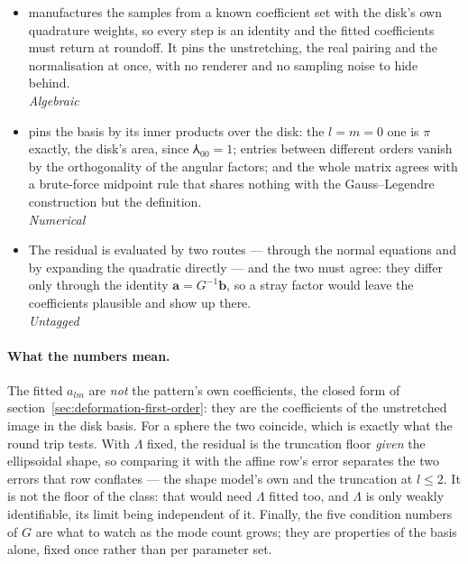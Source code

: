 \begin{itemize}
  \item[$\checkmark$]  manufactures the samples from a known
    coefficient set with the disk's own quadrature weights, so every step is an identity and the
    fitted coefficients must return at roundoff.  It pins the unstretching, the real pairing and the
    normalisation at once, with no renderer and no sampling noise to hide behind.
    \\[1pt] \quad \emph{Algebraic}
  \item[$\checkmark$]  pins the basis by its inner products over the disk: the
    $l = m = 0$ one is $\pi$ exactly, the disk's area, since $\Yup_{00} = 1$; entries between
    different orders vanish by the orthogonality of the angular factors; and the whole matrix agrees
    with a brute-force midpoint rule that shares nothing with the Gauss--Legendre construction but
    the definition.
    \\[1pt] \quad \emph{Numerical}
  \item[$\checkmark$] The residual is evaluated by two routes --- through the normal equations and by
    expanding the quadratic directly --- and the two must agree: they differ only through the
    identity $\mathbf{a} = G^{-1}\mathbf{b}$, so a stray factor would leave the coefficients
    plausible and show up there.
    \\[1pt] \emph{Untagged}
\end{itemize}

\paragraph{What the numbers mean.}  The fitted $a_{lm}$ are \emph{not} the pattern's own coefficients, the closed form of
section~\ref{sec:deformation-first-order}: they are the coefficients of the unstretched image in the disk
basis.  For a sphere the two coincide, which is exactly what the round trip tests.  With $\Lambda$
fixed, the residual is the truncation floor \emph{given} the ellipsoidal shape, so comparing it with
the affine row's error separates the two errors that row conflates --- the shape model's own and the
truncation at $l \le 2$.  It is not the floor of the class: that would need $\Lambda$ fitted too, and
$\Lambda$ is only weakly identifiable, its limit being independent of it.  Finally, the five condition numbers of $G$ are what to watch as the
mode count grows; they are properties of the basis alone, fixed once rather than per parameter set.

